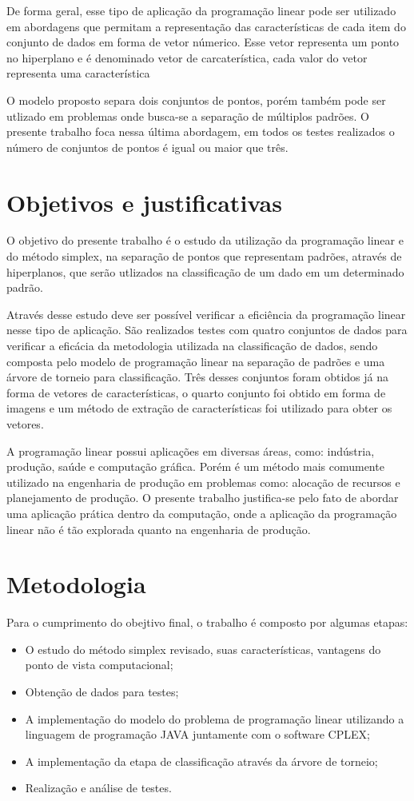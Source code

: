 De forma geral, esse tipo de aplicação da programação linear pode ser utilizado em abordagens que permitam a representação das características de cada item do conjunto de dados em forma de vetor númerico. Esse vetor representa um ponto no hiperplano e é denominado vetor de carcaterística, cada valor do vetor representa uma característica

O modelo proposto separa dois conjuntos de pontos, porém também pode ser utlizado em problemas onde busca-se a separação de múltiplos padrões. O presente trabalho foca nessa última abordagem, em todos os testes realizados o número de conjuntos de pontos é igual ou maior que três.

\section{Objetivos e justificativas}
O objetivo do presente trabalho é o estudo da utilização da programação linear e do método simplex, na separação de pontos que representam padrões, através de hiperplanos, que serão utlizados na classificação de um dado em um determinado padrão.

Através desse estudo deve ser possível verificar a eficiência da programação linear nesse tipo de aplicação. São realizados testes com quatro conjuntos de dados para verificar a eficácia da metodologia utilizada na classificação de dados, sendo composta pelo modelo de programação linear na separação de padrões e uma árvore de torneio para classificação. Três desses conjuntos foram obtidos já na forma de vetores de características, o quarto conjunto foi obtido em forma de imagens e um método de extração de características foi utilizado para obter os vetores.

A programação linear possui aplicações em diversas áreas, como: indústria, produção, saúde e computação gráfica. Porém é um método mais comumente utilizado na engenharia de produção em problemas como: alocação de recursos e planejamento de produção. O presente trabalho justifica-se pelo fato de abordar uma aplicação prática dentro da computação, onde a aplicação da programação linear não é tão explorada quanto na engenharia de produção.

\section{Metodologia}
Para o cumprimento do obejtivo final, o trabalho é composto por algumas etapas:

\begin{itemize} 
\item O estudo do método simplex revisado, suas características, vantagens do ponto de vista computacional;
\item Obtenção de dados para testes;
\item A implementação do modelo do problema de programação linear utilizando a linguagem de programação JAVA juntamente com o software CPLEX;
\item A implementação da etapa de classificação através da árvore de torneio;
\item Realização e análise de testes. 
\end{itemize}

